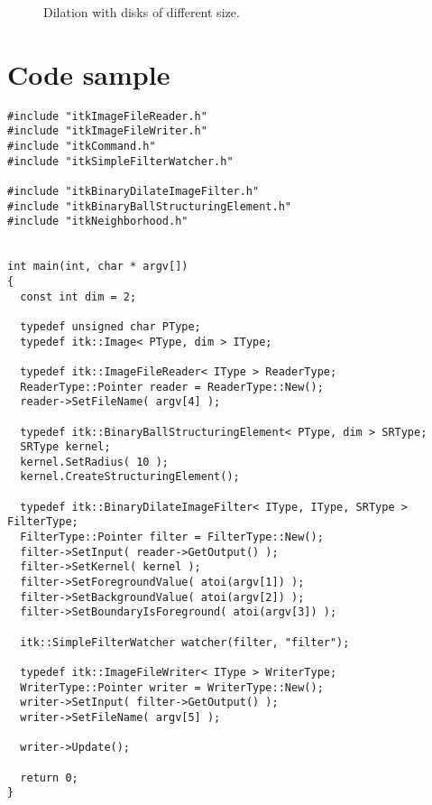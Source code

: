 \documentclass{InsightArticle}
\begin{document}
\begin{figure}[htbp]
\begin{center}
\caption{Dilation with disks of different size.\label{dilateerode_1pt}}
\end{center}
\end{figure}


\section{Code sample}

\small \begin{verbatim}
#include "itkImageFileReader.h"
#include "itkImageFileWriter.h"
#include "itkCommand.h"
#include "itkSimpleFilterWatcher.h"

#include "itkBinaryDilateImageFilter.h"
#include "itkBinaryBallStructuringElement.h"
#include "itkNeighborhood.h"


int main(int, char * argv[])
{
  const int dim = 2;
  
  typedef unsigned char PType;
  typedef itk::Image< PType, dim > IType;

  typedef itk::ImageFileReader< IType > ReaderType;
  ReaderType::Pointer reader = ReaderType::New();
  reader->SetFileName( argv[4] );

  typedef itk::BinaryBallStructuringElement< PType, dim > SRType;
  SRType kernel;
  kernel.SetRadius( 10 );
  kernel.CreateStructuringElement();

  typedef itk::BinaryDilateImageFilter< IType, IType, SRType > FilterType;
  FilterType::Pointer filter = FilterType::New();
  filter->SetInput( reader->GetOutput() );
  filter->SetKernel( kernel );
  filter->SetForegroundValue( atoi(argv[1]) );
  filter->SetBackgroundValue( atoi(argv[2]) );
  filter->SetBoundaryIsForeground( atoi(argv[3]) );

  itk::SimpleFilterWatcher watcher(filter, "filter");

  typedef itk::ImageFileWriter< IType > WriterType;
  WriterType::Pointer writer = WriterType::New();
  writer->SetInput( filter->GetOutput() );
  writer->SetFileName( argv[5] );

  writer->Update();

  return 0;
}
\end{verbatim} \normalsize
\end{document}
